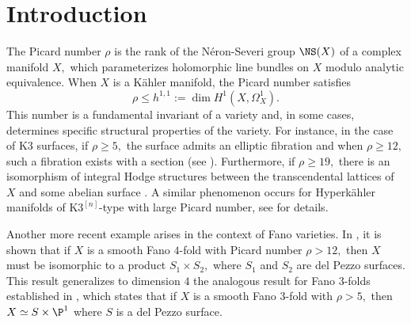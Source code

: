 \documentclass[11pt,leqno]{article}
\theoremstyle{definition}
\begin{document}
 
\begin{abstract}
The rank $\rho$ of the Néron-Severi group of a complex torus $X$ of dimension $g$ satisfies $0\leq\rho\leq g^2=h^{1,1}.$ The degree $\mathfrak{d}$ of the extension field generated over $\Q$ by the entries of a period matrix of $X$ imposes constraints on its Picard number $\rho$ and, consequently, on the structure of 
$X$. In this paper, we show that when $\mathfrak{d}$ is $2$, $3$, or $4$, the Picard number $\rho$ is necessarily large. Moreover, for an abelian variety $X$ of dimension $g$ with $\mathfrak{d}=3,$  we establish a structure-type result: $X$ must be isogenous to $E^g$, where $E$ is an elliptic curve without complex multiplication. In this case, the Picard number satisfies $\rho(X)=\frac{g(g+1)}{2}.$ As a byproduct, we obtain that if $\mathfrak{d}$ is odd, then $\rho(X)\leq\frac{g(g+1)}{2}.$
\end{abstract}

\section{Introduction}
\label{intro}
The Picard number $\rho$ is the rank of the Néron-Severi group $\NS(X)$ of a complex manifold $X,$ which parameterizes holomorphic line bundles on $X$ modulo analytic equivalence. When $X$ is a Kähler manifold, the Picard number satisfies 
$$\rho\leq h^{1,1}:=\dim H^1(X,\Omega_X^1).$$  
This number is a fundamental invariant of a variety and, in some cases, determines specific structural properties of the variety. For instance, in the case of K$3$ surfaces, if $\rho\geq 5,$ the surface admits an elliptic fibration and when $\rho\geq 12,$ such a fibration exists with a section (see \cite[\S 11.1]{huybrechts2016lectures}). Furthermore, if $\rho\geq 19,$ there is an isomorphism of integral Hodge structures between the transcendental lattices of $X$ and some abelian surface \cite{Morrison1984}. A similar phenomenon occurs for Hyperk\"{a}hler manifolds of K$3^{[n]}$-type with large Picard number, see \cite{prieto2024hyperk} for details.


Another more recent example arises in the context of Fano varieties. In \cite{casagrande2024}, it is shown that if $X$ is a smooth Fano $4$-fold with Picard number $\rho>12,$ then $X$ must be isomorphic to a product $S_1\times S_2,$ where $S_1$ and $S_2$ are del Pezzo surfaces. This result generalizes to dimension $4$ the analogous result for Fano $3$-folds established in \cite{mori1981classification}, which states that if $X$ is a smooth Fano $3$-fold with $\rho>5,$ then $X\simeq S\times \P^1$ where $S$ is a del Pezzo surface.
\end{document}
